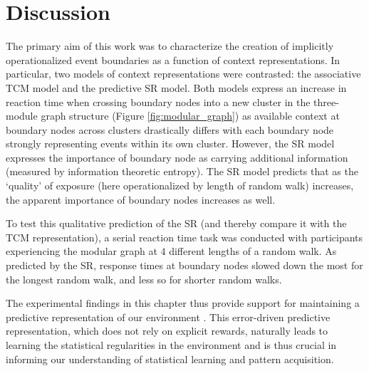 \section{Discussion}

The primary aim of this work was to characterize the creation of implicitly operationalized event boundaries as a function of context representations. In particular, two models of context representations were contrasted: the associative TCM model and the predictive SR model. Both models express an increase in reaction time when crossing boundary nodes into a new cluster in the three-module graph structure (Figure \ref{fig:modular_graph}) as available context at boundary nodes across clusters drastically differs with each boundary node strongly representing events within its own cluster. However, the SR model \ac{expresses} the importance of boundary node as carrying additional information (measured by information theoretic entropy). The SR model predicts that as the `quality' of exposure (here operationalized by length of random walk) increases, the apparent importance of boundary nodes increases as well. 

To test this qualitative prediction of the SR (and thereby compare it with the TCM representation), a serial reaction time task was conducted with participants experiencing the modular graph at 4 different lengths of a random walk. As predicted by the SR, response times at boundary nodes slowed down the most for the longest random walk, and less so for shorter random walks. 

The experimental findings in this chapter thus provide support for maintaining a predictive representation of our environment . This error-driven predictive representation, which does not rely on explicit rewards, naturally leads to learning the statistical regularities in the environment and is thus crucial in informing our understanding of statistical learning and pattern acquisition. 


